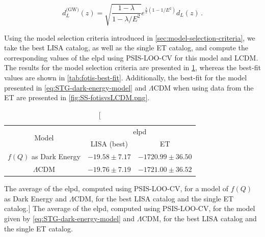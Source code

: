\begin{equation}
    d_L^\text{(GW)}(z) = \sqrt{ \frac{1 - \lambda}{1 - \lambda/E^2}} e^{\frac{\lambda}{2}(1 - 1/E^2)} d_L(z) \,.
\end{equation}

Using the model selection criteria introduced in \cref{sec:model-selection-criteria}, we take the best \gls{LISA} catalog, as well as the single \gls{ET} catalog, and compute the corresponding values of the \gls{elpd} using \gls{PSIS-LOO-CV} for this model and \gls{LCDM}. The results for the model selection criteria are presented in \cref{tab:elpd-SS}, whereas the best-fit values are shown in \cref{tab:fotis-best-fit}. Additionally, the best-fit for the model presented in \cref{eq:STG-dark-energy-model} and $\Lambda$CDM when using data from the \gls{ET} are presented in \cref{fig:SS-fotisvsLCDM.png}.

\vspace{0.5cm}

\begin{table}[h!]
    \centering
    \begin{tabular}{|c|cc|}
        \hline
        \multirow{2}{*}{Model} & \multicolumn{2}{c|}{elpd}                                     \\ \cline{2-3}
                               & \multicolumn{1}{c|}{LISA (best)}       & ET                   \\ \hline
        $f(Q)$ as Dark Energy  & \multicolumn{1}{c|}{$-19.58 \pm 7.17$} & $-1720.99 \pm 36.50$ \\ \hline
        $\Lambda$CDM           & \multicolumn{1}{c|}{$-19.76 \pm 7.19$} & $-1721.00 \pm 36.52$ \\ \hline
    \end{tabular}
    \caption
    [The average of the elpd, computed using PSIS-LOO-CV, for a model of $f(Q)$ as Dark Energy and $\Lambda$CDM, for the best LISA catalog and the single ET catalog.]
    {The average of the \gls{elpd}, computed using \gls{PSIS-LOO-CV}, for the model given by \cref{eq:STG-dark-energy-model} and $\Lambda$CDM, for the best \gls{LISA} catalog and the single \gls{ET} catalog.}
    \label{tab:elpd-SS}
\end{table}

